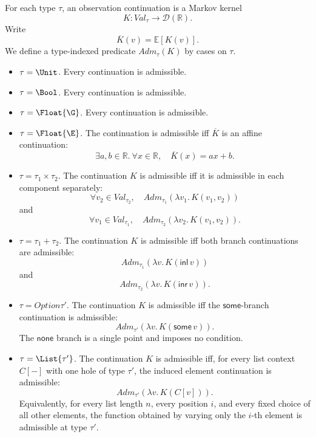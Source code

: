 \begin{definition}
  For each type \(\tau\), an observation continuation is a Markov kernel
  \[
    K : Val_\tau \to \mathcal{D}(\mathbb{R}).
  \]
  Write
  \[
    \overline{K}(v) = \mathbb{E}[K(v)].
  \]
  We define a type-indexed predicate \(Adm_\tau(K)\) by cases on \(\tau\).

  \begin{itemize}
    \item \(\tau = \Unit\). Every continuation is admissible.

    \item \(\tau = \Bool\). Every continuation is admissible.

    \item \(\tau = \Float{\G}\). Every continuation is admissible.

    \item \(\tau = \Float{\E}\). The continuation is admissible iff
    \(\overline{K}\) is an affine continuation:
    \[
      \exists a,b \in \mathbb{R}.\ \forall x \in \mathbb{R},\quad
      \overline{K}(x) = ax + b.
    \]

    \item \(\tau = \tau_1 \times \tau_2\). The continuation \(K\) is
    admissible iff it is admissible in each component separately:
    \[
      \forall v_2 \in Val_{\tau_2},\quad
      Adm_{\tau_1}(\lambda v_1.\,K(v_1,v_2))
    \]
    and
    \[
      \forall v_1 \in Val_{\tau_1},\quad
      Adm_{\tau_2}(\lambda v_2.\,K(v_1,v_2)).
    \]

    \item \(\tau = \tau_1 + \tau_2\). The continuation \(K\) is admissible iff
    both branch continuations are admissible:
    \[
      Adm_{\tau_1}(\lambda v.\,K(\mathsf{inl}\,v))
    \]
    and
    \[
      Adm_{\tau_2}(\lambda v.\,K(\mathsf{inr}\,v)).
    \]

    \item \(\tau = Option{\tau'}\). The continuation \(K\) is admissible iff
    the \(\mathsf{some}\)-branch continuation is admissible:
    \[
      Adm_{\tau'}(\lambda v.\,K(\mathsf{some}\,v)).
    \]
    The \(\mathsf{none}\) branch is a single point and imposes no condition.

    \item \(\tau = \List{\tau'}\). The continuation \(K\) is admissible iff,
    for every list context \(C[-]\) with one hole of type \(\tau'\), the induced
    element continuation is admissible:
    \[
      Adm_{\tau'}(\lambda v.\,K(C[v])).
    \]
    Equivalently, for every list length \(n\), every position \(i\), and every
    fixed choice of all other elements, the function obtained by varying only
    the \(i\)-th element is admissible at type \(\tau'\).


\end{itemize}
\end{definition}
